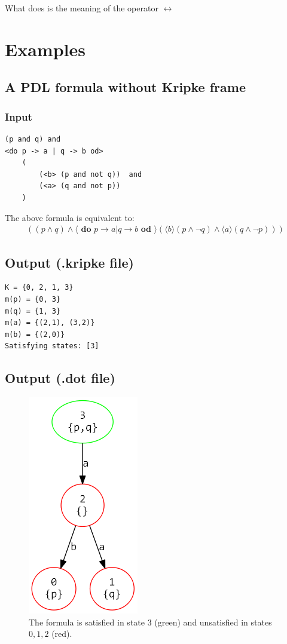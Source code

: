 \documentclass[12pt,a4paper]{article}
\begin{document}
What does is the meaning of the operator $\leftrightarrow$

\section{Examples}

\subsection{A PDL formula without Kripke frame}

\subsubsection*{Input}
\begin{verbatim}
(p and q) and
<do p -> a | q -> b od>
    (
        (<b> (p and not q))  and
        (<a> (q and not p))
    )
\end{verbatim}
The above formula is equivalent to:
\begin{align*}
((p \wedge q) \wedge \langle\textbf{ do }p \rightarrow a \vert q \rightarrow b\textbf{ od }\rangle(\langle b\rangle(p \wedge \neg q) \wedge \langle a \rangle(q \wedge \neg p)))
\end{align*}
\subsection*{Output (.kripke file)}
\begin{verbatim}
K = {0, 2, 1, 3}
m(p) = {0, 3}
m(q) = {1, 3}
m(a) = {(2,1), (3,2)}
m(b) = {(2,0)}
Satisfying states: [3]
\end{verbatim}
\subsection*{Output (.dot file)}

\begin{figure}[H]
\center
\includegraphics[scale=0.4]{example1.png}

\caption{The formula is satisfied in state $3$ (green) and unsatisfied in states $0, 1, 2$ (red). }
\end{figure}
\end{document}
